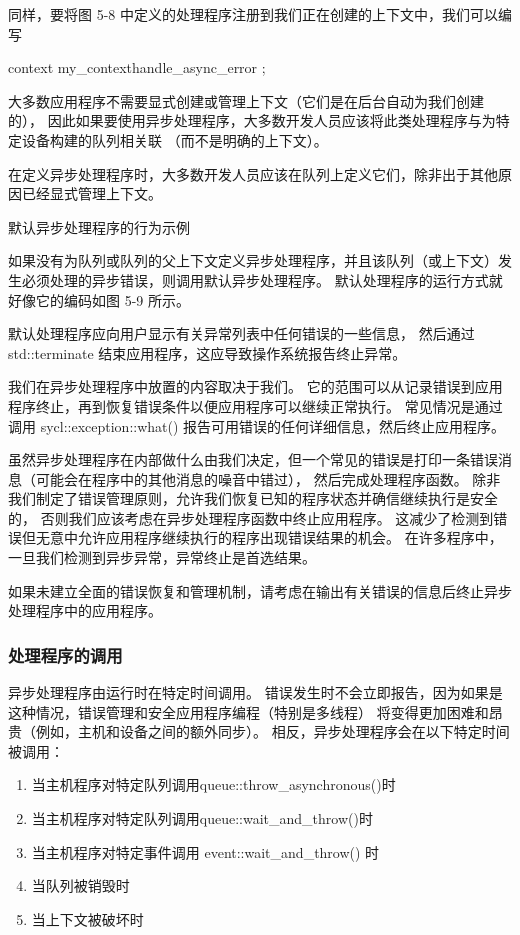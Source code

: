 同样，要将图 5-8 中定义的处理程序注册到我们正在创建的上下文中，我们可以编写

context my\_context{handle\_async\_error };

大多数应用程序不需要显式创建或管理上下文（它们是在后台自动为我们创建的），
因此如果要使用异步处理程序，大多数开发人员应该将此类处理程序与为特定设备构建的队列相关联 （而不是明确的上下文）。

\begin{remark}
	在定义异步处理程序时，大多数开发人员应该在队列上定义它们，除非出于其他原因已经显式管理上下文。
\end{remark}

{\color{red} 默认异步处理程序的行为示例}

如果没有为队列或队列的父上下文定义异步处理程序，并且该队列（或上下文）发生必须处理的异步错误，则调用默认异步处理程序。 
默认处理程序的运行方式就好像它的编码如图 5-9 所示。

默认处理程序应向用户显示有关异常列表中任何错误的一些信息，
然后通过 std::terminate 结束应用程序，这应导致操作系统报告终止异常。

我们在异步处理程序中放置的内容取决于我们。 
它的范围可以从记录错误到应用程序终止，再到恢复错误条件以便应用程序可以继续正常执行。 
常见情况是通过调用 sycl::exception::what() 报告可用错误的任何详细信息，然后终止应用程序。

虽然异步处理程序在内部做什么由我们决定，但一个常见的错误是打印一条错误消息（可能会在程序中的其他消息的噪音中错过），
然后完成处理程序函数。 除非我们制定了错误管理原则，允许我们恢复已知的程序状态并确信继续执行是安全的，
否则我们应该考虑在异步处理程序函数中终止应用程序。 
这减少了检测到错误但无意中允许应用程序继续执行的程序出现错误结果的机会。 
在许多程序中，一旦我们检测到异步异常，异常终止是首选结果。

\begin{remark}
	如果未建立全面的错误恢复和管理机制，请考虑在输出有关错误的信息后终止异步处理程序中的应用程序。
\end{remark}

\subsubsection{处理程序的调用}
异步处理程序由运行时在特定时间调用。 
错误发生时不会立即报告，因为如果是这种情况，错误管理和安全应用程序编程（特别是多线程）
将变得更加困难和昂贵（例如，主机和设备之间的额外同步）。 相反，异步处理程序会在以下特定时间被调用：

\begin{enumerate}
	\item 当主机程序对特定队列调用queue::throw\_asynchronous()时

	\item 当主机程序对特定队列调用queue::wait\_and\_throw()时

	\item 当主机程序对特定事件调用 event::wait\_and\_throw() 时

	\item 当队列被销毁时

	\item 当上下文被破坏时
\end{enumerate}

